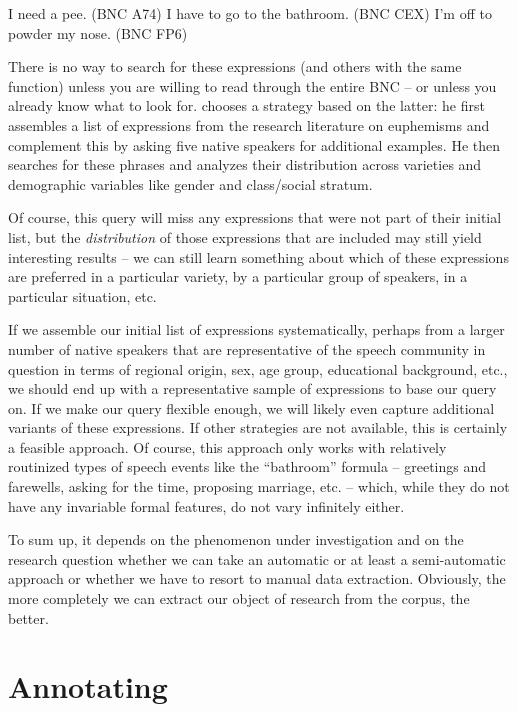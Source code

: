 \begin{exe}
\ex
\begin{xlist} 
\label{ex:bathroomformula}
\ex I need a pee. (BNC A74)
\ex I have to go to the bathroom. (BNC CEX)
\ex I'm off to powder my nose. (BNC FP6)
\end{xlist}
\end{exe}

There is no way to search for these expressions (and others with the same function) unless you are willing to read through the entire BNC -- or unless you already know what to look for. \citet{levin_bathroom_2014} chooses a strategy based on the latter: he first assembles a list of expressions from the research literature on euphemisms and complement this by asking five native speakers for additional examples. He then searches for these phrases and analyzes their distribution across varieties and demographic variables like gender and class/social stratum.

Of course, this query will miss any expressions that were not part of their initial list, but the \emph{distribution} of those expressions that are included may still yield interesting results -- we can still learn something about which of these expressions are preferred in a particular variety, by a particular group of speakers, in a particular situation, etc.

If we assemble our initial list of expressions systematically, perhaps from a larger number of native speakers that are representative of the speech community in question in terms of regional origin, sex, age group, educational background, etc., we should end up with a representative sample of expressions to base our query on. If we make our query flexible enough, we will likely even capture additional variants of these expressions. If other strategies are not available, this is certainly a feasible approach. Of course, this approach only works with relatively routinized types of speech events like the ``bathroom'' formula -- greetings and farewells, asking for the time, proposing marriage, etc. -- which, while they do not have any invariable formal features, do not vary infinitely either.

To sum up, it depends on the phenomenon under investigation and on the research question whether we can take an automatic or at least a semi-automatic approach or whether we have to resort to manual data extraction. Obviously, the more completely we can extract our object of research from the corpus, the better.

\section{Annotating}
\label{sec:annotating}

